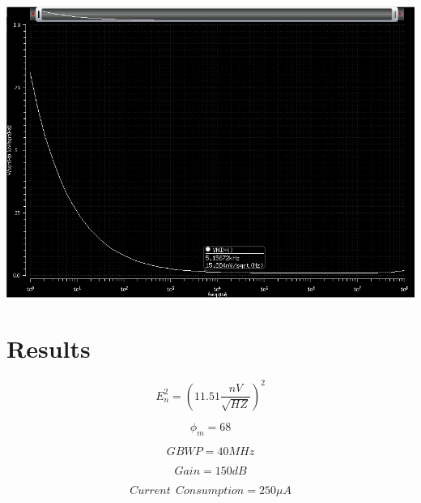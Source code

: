 \centering
\includegraphics[width=1\textwidth]{Capitoli/ncf1.png}
\raggedright



\section{Results} %
\label{sec:results}


\begin{equation}
  E_n^2=( 11.51 \frac {nV} { \sqrt{HZ}})^2
\end{equation}

\begin{equation}
  \phi_m=68
\end{equation}

\begin{equation}
  GBWP=40MHz
\end{equation}

\begin{equation}
  Gain=150dB
\end{equation}

\begin{equation}
  Current \ \ Consumption = 250 \mu A
\end{equation}


